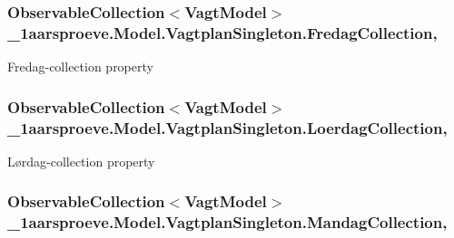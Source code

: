 \subsubsection[{Fredag\+Collection}]{\setlength{\rightskip}{0pt plus 5cm}Observable\+Collection$<${\bf Vagt\+Model}$>$ \+\_\+1aarsproeve.\+Model.\+Vagtplan\+Singleton.\+Fredag\+Collection\hspace{0.3cm}{\ttfamily [get]}, {\ttfamily [set]}}\label{class__1aarsproeve_1_1_model_1_1_vagtplan_singleton_a8f4285898ec9478919b58cb470360aef}


Fredag-\/collection property 

\hypertarget{class__1aarsproeve_1_1_model_1_1_vagtplan_singleton_ad7b48a8f9c6bc814aa89af35df3373bd}{}
\subsubsection[{Loerdag\+Collection}]{\setlength{\rightskip}{0pt plus 5cm}Observable\+Collection$<${\bf Vagt\+Model}$>$ \+\_\+1aarsproeve.\+Model.\+Vagtplan\+Singleton.\+Loerdag\+Collection\hspace{0.3cm}{\ttfamily [get]}, {\ttfamily [set]}}\label{class__1aarsproeve_1_1_model_1_1_vagtplan_singleton_ad7b48a8f9c6bc814aa89af35df3373bd}


Lørdag-\/collection property 

\hypertarget{class__1aarsproeve_1_1_model_1_1_vagtplan_singleton_a798188a332aa72ae776750249c10dfa8}{}
\subsubsection[{Mandag\+Collection}]{\setlength{\rightskip}{0pt plus 5cm}Observable\+Collection$<${\bf Vagt\+Model}$>$ \+\_\+1aarsproeve.\+Model.\+Vagtplan\+Singleton.\+Mandag\+Collection\hspace{0.3cm}{\ttfamily [get]}, {\ttfamily [set]}}\label{class__1aarsproeve_1_1_model_1_1_vagtplan_singleton_a798188a332aa72ae776750249c10dfa8}


